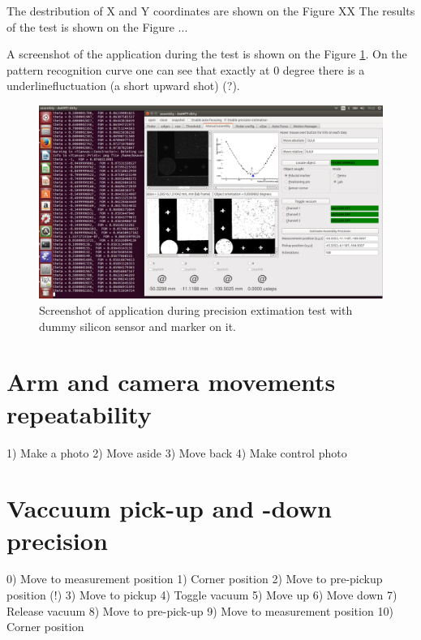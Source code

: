 The destribution of X and Y coordinates are shown on the Figure XX
The results of the test is shown on the Figure ...





A screenshot of the application during the test is shown on the Figure \ref{fig:marker_pattern_recognition_screenshot}. On the pattern recognition curve one can see that exactly at 0 degree there is a underline{fluctuation (a short upward shot) (?)}. 

\begin{figure}[ht]\centering
\includegraphics[width=0.8\linewidth]{Data/Precision_tests/Marker_pattern_recognition_screenshot.png}
\caption{Screenshot of application during precision extimation test with dummy silicon sensor and marker on it.}
\label{fig:marker_pattern_recognition_screenshot}
\end{figure}

\section{Arm and camera movements repeatability }

1) Make a photo
2) Move aside
3) Move back
4) Make control photo

\section{Vaccuum pick-up and -down precision}

0) Move to measurement position
1) Corner position
2) Move to pre-pickup position (!)
3) Move to pickup
4) Toggle vacuum 
5) Move up
6) Move down
7) Release vacuum
8) Move to pre-pick-up
9) Move to measurement position
10) Corner position

